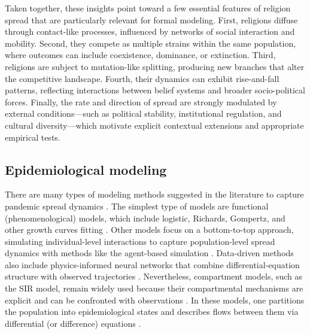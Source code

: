 \documentclass[11pt,a4paper]{article}
\begin{document}
Taken together, these insights point toward a few essential features of religion spread that are particularly relevant for formal modeling. First, religions diffuse through contact-like processes, influenced by networks of social interaction and mobility. Second, they compete as multiple strains within the same population, where outcomes can include coexistence, dominance, or extinction. Third, religions are subject to mutation-like splitting, producing new branches that alter the competitive landscape. Fourth, their dynamics can exhibit rise-and-fall patterns, reflecting interactions between belief systems and broader socio-political forces. Finally, the rate and direction of spread are strongly modulated by external conditions---such as political stability, institutional regulation, and cultural diversity---which motivate explicit contextual extensions and appropriate empirical tests.

\subsection{Epidemiological modeling}
There are many types of modeling methods suggested in the literature to capture pandemic spread dynamics \cite{tang2020review,chang2020game,pare2020modeling}. The simplest type of models are functional (phenomenological) models, which include logistic, Richards, Gompertz, and other growth curves fitting \cite{Lazebnik2023EcoModReview}. Other models focus on a bottom-to-top approach, simulating individual-level interactions to capture population-level spread dynamics with methods like the agent-based simulation \cite{Lazebnik2024ABMsupply,kerr2021covasim,silva2020covid,hunter2020hybrid}. Data-driven methods also include physics-informed neural networks that combine differential-equation structure with observed trajectories \cite{PLOSCompBio2025VOCsINN}. Nevertheless, compartment models, such as the SIR model, remain widely used because their compartmental mechanisms are explicit and can be confronted with observations \cite{zhang2022usage,mirsaeedi2025compartmental}. In these models, one partitions the population into epidemiological states and describes flows between them via differential (or difference) equations \cite{first_sir}. 
\end{document}
